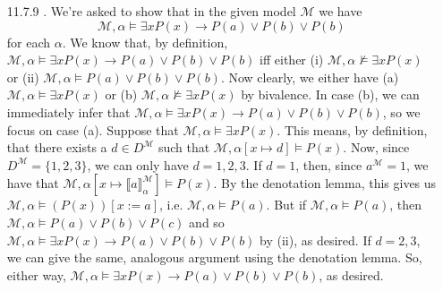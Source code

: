 \begin{itemize}
                        \item[11.7.9]. We're asked to show that in the
                          given model $\mathcal{M}$ we have
                          \[\mathcal{M},\alpha\vDash \exists xP(x)\to
                          P(a)\lor P(b)\lor P(b)\] for each
                          $\alpha$. We know that, by definition, $\mathcal{M},\alpha\vDash \exists xP(x)\to
                          P(a)\lor P(b)\lor P(b)$ iff either (i)
                          $\mathcal{M},\alpha\nvDash \exists xP(x)$ or (ii)
                          $\mathcal{M},\alpha\vDash
                          P(a)\lor P(b)\lor P(b)$. Now clearly, we
                          either have (a) $\mathcal{M},\alpha\vDash
                          \exists xP(x)$ or (b)
                          $\mathcal{M},\alpha\nvDash \exists xP(x)$ by
                          bivalence. In case (b), we can immediately
                          infer that $\mathcal{M},\alpha\vDash \exists xP(x)\to
                          P(a)\lor P(b)\lor P(b)$, so we focus on case
                          (a). Suppose that $\mathcal{M},\alpha\vDash
                          \exists xP(x)$. This means, by definition,
                          that there exists a $d\in D^\mathcal{M}$
                          such that $\mathcal{M},\alpha[x\mapsto d]\vDash
                           P(x)$. Now, since
                           $D^\mathcal{M}=\{1,2,3\}$, we can only have
                           $d=1,2,3$. If $d=1$, then, since
                           $a^\mathcal{M}=1$, we have that
                           $\mathcal{M},\alpha[x\mapsto \llbracket
                           a\rrbracket^\mathcal{M}_\alpha]\vDash 
                           P(x)$. By the denotation lemma, this gives
                           us $\mathcal{M},\alpha\vDash 
                           (P(x))[x:=a]$, i.e. $\mathcal{M},\alpha\vDash 
                           P(a)$. But if $\mathcal{M},\alpha\vDash 
                           P(a)$, then $\mathcal{M},\alpha\vDash 
                           P(a)\lor P(b)\lor P(c)$ and so $\mathcal{M},\alpha\vDash \exists xP(x)\to
                          P(a)\lor P(b)\lor P(b)$ by (ii), as
                          desired. If $d=2,3$, we can give the same,
                          analogous argument using the denotation
                          lemma. So, either way,  $\mathcal{M},\alpha\vDash \exists xP(x)\to
                          P(a)\lor P(b)\lor P(b)$, as desired.


\end{itemize}

